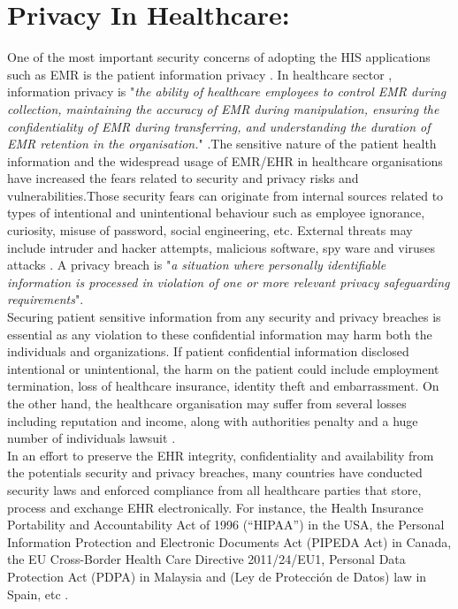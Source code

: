 \section{Privacy In Healthcare:}
One of the most important security concerns of adopting the HIS applications such as EMR is the patient information privacy \cite{Mahfuth2016}. In healthcare sector , information privacy is "\textit{the ability of healthcare employees to control EMR during collection, maintaining the accuracy of EMR during manipulation, ensuring the confidentiality of EMR during transferring, and understanding the duration of EMR retention in the organisation.}" \cite{Rahim2016}.The sensitive nature of the patient health information and the widespread usage of EMR/EHR in healthcare organisations have increased the fears related to security and privacy risks and vulnerabilities.Those security fears can originate from internal sources related to types of intentional and unintentional behaviour such as employee ignorance, curiosity, misuse of password, social engineering, etc. External threats may include intruder and hacker attempts, malicious software, spy ware and viruses attacks  \cite{Samy2010b}. A privacy breach is "\textit{a situation where personally identifiable information is processed in violation of one or more relevant privacy safeguarding requirements}"\cite{ISO/IEC}.\\Securing patient sensitive information from any security and privacy breaches is essential as any violation to these confidential information may harm both the individuals and organizations. If patient confidential information disclosed intentional or unintentional, the harm on the patient could include employment termination, loss of healthcare insurance, identity theft and embarrassment. On the other hand, the healthcare organisation may suffer from several losses including reputation and income, along with authorities penalty and a huge number of individuals lawsuit \cite{Wartenberg2010,Culnan2016}. \\

In an effort to preserve the EHR integrity, confidentiality and availability from the potentials security and privacy breaches, many countries have conducted security laws and enforced compliance from all healthcare parties that store, process and exchange EHR electronically\cite{Hsu,Samy2010,Rahim2016}. For instance, the Health Insurance Portability and Accountability Act of 1996 (“HIPAA”) in the USA, the Personal Information Protection and Electronic Documents Act (PIPEDA  Act) in Canada, the EU Cross-Border Health Care Directive 2011/24/EU1, Personal Data Protection Act (PDPA) in Malaysia and (Ley de Protección de Datos) law in Spain, etc \cite{Bensefia2014,U.S.DepartmentofHealthandHumanServices}. \\


